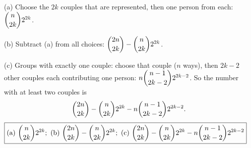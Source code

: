 (a) Choose the $2k$ couples that are represented, then one person from each: $\dbinom{n}{2k}2^{2k}$.

(b) Subtract (a) from all choices: $\dbinom{2n}{2k}-\dbinom n{2k}2^{2k}$.

(c) Groups with exactly one couple: choose that couple ($n$ ways), then $2k-2$ other couples each contributing one person: $n\dbinom{n-1}{2k-2}2^{2k-2}$. So the number with at least two couples is
\[\dbinom{2n}{2k}-\dbinom n{2k}2^{2k}-n\dbinom{n-1}{2k-2}2^{2k-2}.\]
$\boxed{\text{(a) }\dbinom n{2k}2^{2k};\ \text{(b) }\dbinom{2n}{2k}-\dbinom n{2k}2^{2k};\ \text{(c) }\dbinom{2n}{2k}-\dbinom n{2k}2^{2k}-n\dbinom{n-1}{2k-2}2^{2k-2}}$
